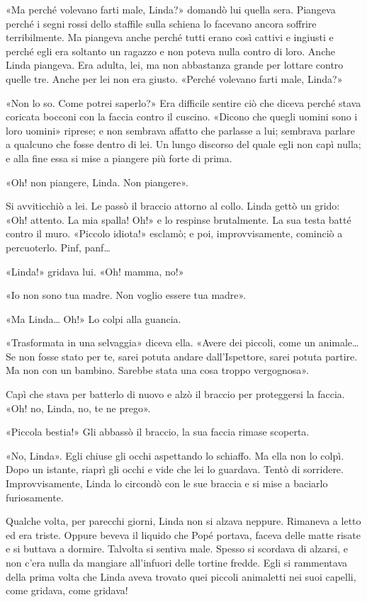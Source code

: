 \documentclass[
a5paper, %
10pt, %
twoside, 
onecolumn, %
openany, %
]{memoir}
\begin{document}
«Ma perché volevano farti male, Linda?» domandò lui quella sera. Piangeva perché i segni rossi dello staffile sulla schiena lo facevano ancora soffrire terribilmente. Ma piangeva anche perché tutti erano così cattivi e ingiusti e perché egli era soltanto un ragazzo e non poteva nulla contro di loro. Anche Linda piangeva. Era adulta, lei, ma non abbastanza grande per lottare contro quelle tre. Anche per lei non era giusto. «Perché volevano farti male, Linda?»

«Non lo so. Come potrei saperlo?» Era difficile sentire ciò che diceva perché stava coricata bocconi con la faccia contro il cuscino. «Dicono che quegli uomini sono i loro uomini» riprese; e non sembrava affatto che parlasse a lui; sembrava parlare a qualcuno che fosse dentro di lei. Un lungo discorso del quale egli non capì nulla; e alla fine essa si mise a piangere più forte di prima.

«Oh! non piangere, Linda. Non piangere».

Si avviticchiò a lei. Le passò il braccio attorno al collo. Linda gettò un grido: «Oh! attento. La mia spalla! Oh!» e lo respinse brutalmente. La sua testa batté contro il muro. «Piccolo idiota!» esclamò; e poi, improvvisamente, cominciò a percuoterlo. Pinf, panf…

«Linda!» gridava lui. «Oh! mamma, no!»

«Io non sono tua madre. Non voglio essere tua madre».

«Ma Linda… Oh!» Lo colpi alla guancia.

«Trasformata in una selvaggia» diceva ella. «Avere dei piccoli, come un animale… Se non fosse stato per te, sarei potuta andare dall’Ispettore, sarei potuta partire. Ma non con un bambino. Sarebbe stata una cosa troppo vergognosa».

Capì che stava per batterlo di nuovo e alzò il braccio per proteggersi la faccia. «Oh! no, Linda, no, te ne prego».

«Piccola bestia!» Gli abbassò il braccio, la sua faccia rimase scoperta.

«No, Linda». Egli chiuse gli occhi aspettando lo schiaffo. Ma ella non lo colpì. Dopo un istante, riaprì gli occhi e vide che lei lo guardava. Tentò di sorridere. Improvvisamente, Linda lo circondò con le sue braccia e si mise a baciarlo furiosamente.

Qualche volta, per parecchi giorni, Linda non si alzava neppure. Rimaneva a letto ed era triste. Oppure beveva il liquido che Popé portava, faceva delle matte risate e si buttava a dormire. Talvolta si sentiva male. Spesso si scordava di alzarsi, e non c’era nulla da mangiare all’infuori delle tortine fredde. Egli si rammentava della prima volta che Linda aveva trovato quei piccoli animaletti nei suoi capelli, come gridava, come gridava!
\end{document}
